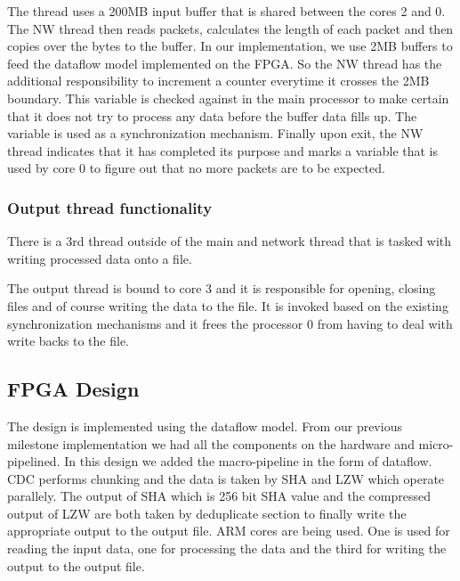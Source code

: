 \documentclass{article}
\begin{document}
The thread uses a 200MB input buffer that is shared between the cores 2 and 0.
\newline
The NW thread then reads packets, calculates the length of each packet and then copies over the bytes to the buffer.
\newline
In our implementation, we use 2MB buffers to feed the dataflow model implemented on the FPGA.
\newline
So the NW thread has the additional responsibility to increment a counter everytime it crosses the 2MB boundary. 
This variable is checked against in the main processor to make certain that it does not try to process any data before the buffer data fills up. The variable is used as a synchronization mechanism.
\newline
Finally upon exit, the NW thread indicates that it has completed its purpose and marks a variable that is used by core 0 to figure out that no more packets are to be expected.
\newline

\subsubsection{Output thread functionality}

There is a 3rd thread outside of the main and network thread that is tasked with writing processed data onto a file. 
\par
The output thread is bound to core 3 and it is responsible for opening, closing files and of course writing the data to the file. 
It is invoked based on the existing synchronization mechanisms and it frees the processor 0 from having to deal with write backs to the file. 
\newline

\subsection{FPGA Design}

The design is implemented using the dataflow model. From our previous milestone implementation we had all the components on the hardware and micro-pipelined. In this design we added the macro-pipeline in the form of dataflow. 
\newline\newline
CDC performs chunking and the data is taken by SHA and LZW which operate parallely. The output of SHA which is 256 bit SHA value and the compressed output of LZW are both taken by deduplicate section to finally write the appropriate output to the output file.
\newline{} ARM cores are being used. One is used for reading the input data, one for processing the data and the third for writing the output to the output file. 
\end{document}
